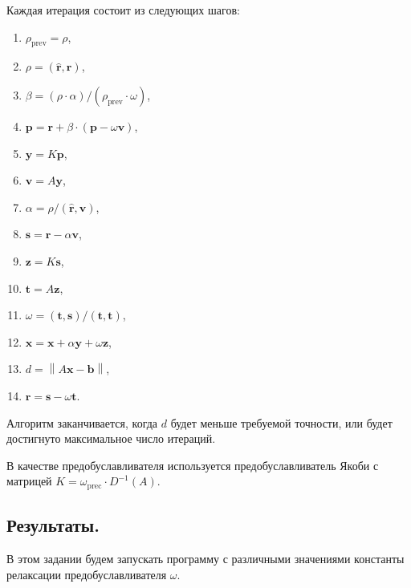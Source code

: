 \documentclass[12pt]{article}
\begin{document}
Каждая итерация состоит из следующих шагов:
\begin{enumerate}
\item $\rho_\text{prev} = \rho$,
\item $\rho = (\mathbf{\hat r}, \mathbf r)$,
\item $\beta = (\rho \cdot \alpha) / (\rho_\text{prev} \cdot \omega)$,
\item $\mathbf p = \mathbf r + \beta \cdot (\mathbf p - \omega \mathbf v)$,
\item $\mathbf y = K \mathbf p$,
\item $\mathbf v = A \mathbf y$,
\item $\alpha = \rho / (\mathbf{\hat r}, \mathbf v)$,
\item $\mathbf s = \mathbf r - \alpha \mathbf v$,
\item $\mathbf z = K \mathbf s$,
\item $\mathbf t = A \mathbf z$,
\item $\omega = (\mathbf t, \mathbf s) / (\mathbf t, \mathbf t)$,
\item $\mathbf x = \mathbf x + \alpha \mathbf y + \omega \mathbf z$,
\item $d = \left\|A \mathbf x - \mathbf b\right\|$,
\item $\mathbf r = \mathbf s - \omega \mathbf t$.
\end{enumerate}
Алгоритм заканчивается, когда $d$ будет меньше требуемой точности, или будет
достигнуто максимальное число итераций.

В качестве предобуславливателя используется предобуславливатель Якоби
с матрицей $K = \omega_\text{prec} \cdot D^{-1}(A)$.

\subsection{Результаты.}

В этом задании будем запускать программу с различными значениями константы релаксации пред\-обуслав\-ливателя $\omega$.
\end{document}
